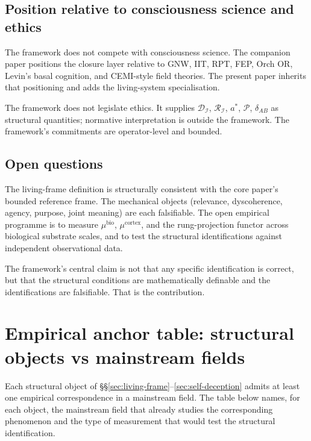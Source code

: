 \documentclass[11pt]{article}
\theoremstyle{plain}
\theoremstyle{definition}
\theoremstyle{remark}
\newcommand{\Ical}{\mathcal{I}}
\newcommand{\Rcal}{\mathcal{R}}
\newcommand{\Dcal}{\mathcal{D}}
\newcommand{\Pcal}{\mathcal{P}}
\begin{document}
\subsection{Position relative to consciousness science and ethics}

The framework does not compete with consciousness science. The companion paper \citet{SmartProcessingToPOV} positions the closure layer relative to GNW, IIT, RPT, FEP, Orch OR, Levin's basal cognition, and CEMI-style field theories. The present paper inherits that positioning and adds the living-system specialisation.

The framework does not legislate ethics. It supplies $\Dcal_\Ical$, $\Rcal_\Ical$, $a^*$, $\Pcal$, $\delta_{AB}$ as structural quantities; normative interpretation is outside the framework. The framework's commitments are operator-level and bounded.

\subsection{Open questions}

The living-frame definition is structurally consistent with the core paper's bounded reference frame. The mechanical objects (relevance, dyscoherence, agency, purpose, joint meaning) are each falsifiable. The open empirical programme is to measure $\mu^{\mathrm{bio}}$, $\mu^{\mathrm{cortex}}$, and the rung-projection functor across biological substrate scales, and to test the structural identifications against independent observational data.

The framework's central claim is not that any specific identification is correct, but that the structural conditions are mathematically definable and the identifications are falsifiable. That is the contribution.

\appendix

\section{Empirical anchor table: structural objects vs mainstream fields}\label{sec:empirical-anchors}

Each structural object of \S\S\ref{sec:living-frame}--\ref{sec:self-deception} admits at least one empirical correspondence in a mainstream field. The table below names, for each object, the mainstream field that already studies the corresponding phenomenon and the type of measurement that would test the structural identification.
\end{document}
